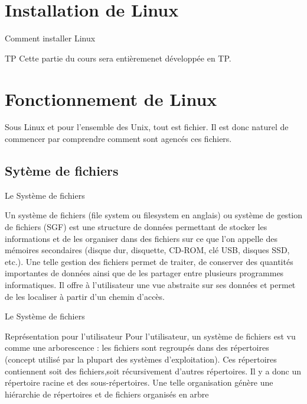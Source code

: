 \documentclass[10pt]{beamer}
\begin{document}
\section{Installation de Linux}
\begin{frame}{Comment installer Linux}
	\begin{alertblock}{TP}
		Cette partie du cours sera entièremenet développée en TP.
	\end{alertblock}
\end{frame}

\section{Fonctionnement de Linux}
\begin{frame}
Sous Linux et pour l'ensemble des Unix, tout est fichier. Il est donc naturel de
commencer par comprendre comment sont agencés ces fichiers.
\end{frame}
\subsection{Sytème de fichiers}
\begin{frame}{Le Système de fichiers}
\begin{definition}
Un système de fichiers (file system ou  filesystem en anglais) ou système de gestion
de fichiers (SGF) est une structure de données permettant de stocker les informations et de les organiser dans des fichiers sur ce que l'on appelle des mémoires secondaires (disque dur, disquette, CD-ROM, clé USB, disques SSD, etc.). Une telle gestion des fichiers permet de traiter, de conserver des quantités importantes de données ainsi que de les partager entre plusieurs programmes informatiques. Il offre à l'utilisateur une vue abstraite sur ses données et permet de les localiser à partir d'un chemin d'accès.
\end{definition}
\end{frame}

\begin{frame}{Le Système de fichiers}
\begin{alertblock}{Représentation pour l'utilisateur}
Pour l'utilisateur, un système de fichiers est vu comme une arborescence : les
fichiers sont regroupés dans des répertoires (concept utilisé par la plupart des systèmes   d'exploitation). Ces répertoires contiennent soit des fichiers,soit récursivement d'autres répertoires. Il y a donc un répertoire racine et des sous-répertoires.  Une  telle   organisation   génère une hiérarchie de répertoires et de fichiers organisés en arbre
\end{alertblock}
\end{frame}
\end{document}

